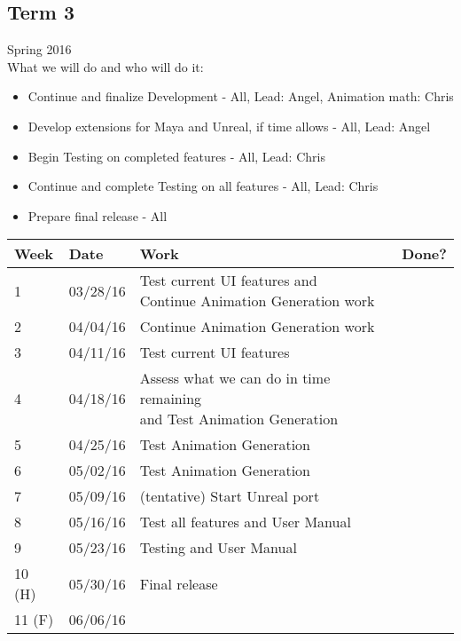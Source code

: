 \subsection{Term 3}
Spring 2016 \\
What we will do and who will do it:
\begin{itemize}
	\item Continue and finalize Development - All, Lead: Angel, Animation math: Chris
	\item Develop extensions for Maya and Unreal, if time allows - All, Lead: Angel
	\item Begin Testing on completed features - All, Lead: Chris
	\item Continue and complete Testing on all features - All, Lead: Chris
	\item Prepare final release - All
\end{itemize}

\begin{table}[H]
\centering
\begin{tabular}{|l|l|l|l|}
\hline
Week 	& Date	 		& Work	 		& 	Done?	 \\ \hline
1		& 03/28/16	 	& \specialcell{Test current UI features and \\ Continue Animation Generation work	}	& 			 \\ \hline
2		& 04/04/16	 	& Continue Animation Generation work		& 			 \\ \hline
3		& 04/11/16	 	& Test current UI features		& 			 \\ \hline
4		& 04/18/16	 	& \specialcell{Assess what we can do in time remaining \\ and Test Animation Generation}		& 			 \\ \hline
5		& 04/25/16	 	& Test Animation Generation		& 			 \\ \hline
6		& 05/02/16	 	& Test Animation Generation		& 			 \\ \hline
7		& 05/09/16	 	& (tentative) Start Unreal port		& 			 \\ \hline
8		& 05/16/16	 	& Test all features and User Manual		& 			 \\ \hline
9		& 05/23/16	 	& Testing and User Manual		& 			 \\ \hline
10 (H)	& 05/30/16	 	& Final release		& 			 \\ \hline
11 (F)	& 06/06/16	 	& 		& 			 \\ \hline
\end{tabular}
\end{table}

